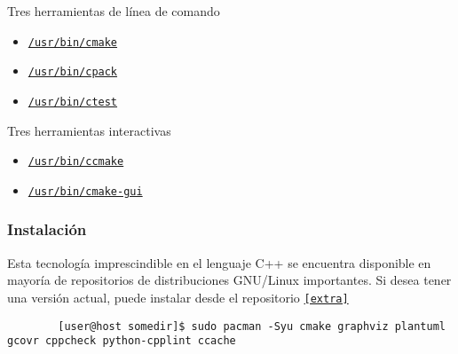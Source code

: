 \begin{frame}[fragile]
	Tres herramientas de línea de comando

	\begin{itemize}
		\item
		
		\href{https://man.archlinux.org/man/cmake.1}{\lstinline{/usr/bin/cmake}}

		\item
		
		\href{https://man.archlinux.org/man/cpack.1}{\lstinline{/usr/bin/cpack}}

		\item
		
		\href{https://man.archlinux.org/man/ctest.1}{\lstinline{/usr/bin/ctest}}
	\end{itemize}

	Tres herramientas interactivas

	\begin{itemize}
		\item
		
		\href{https://man.archlinux.org/man/ccmake.1}{\lstinline{/usr/bin/ccmake}}

		\item
		
		\href{https://man.archlinux.org/man/cmake-gui.1}{\lstinline{/usr/bin/cmake-gui}}
	\end{itemize}
\end{frame}

\begin{frame}[fragile]
	\frametitle{Instalación}
	Esta tecnología imprescindible en el lenguaje C++ se encuentra
	disponible en mayoría de repositorios de distribuciones
	GNU/Linux importantes.
	Si desea tener una versión actual, puede instalar desde el
	repositorio \href{https://archlinux.org/packages/extra/x86_64/cmake}{\lstinline{[extra]}}

	\begin{verbatim}
		[user@host somedir]$ sudo pacman -Syu cmake graphviz plantuml gcovr cppcheck python-cpplint ccache
	\end{verbatim}

\end{frame}



